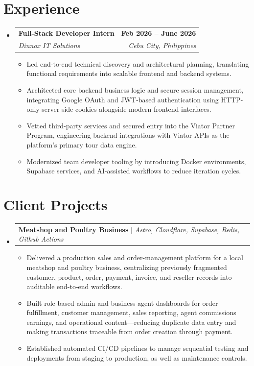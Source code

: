 \documentclass[letterpaper,11pt]{article}
\makeatletter
\newcommand{\resumeItem}[1]{
  \item\small{
    {#1 \vspace{0pt}}
  }
}
\newcommand{\resumeSubheading}[4]{
  \vspace{-2pt}\item
    \begin{tabular*}{1.0\textwidth}[t]{l@{\extracolsep{\fill}}r}
      \textbf{#1} & \textbf{\small #2} \\
      \textit{\small#3} & \textit{\small #4} \\
    \end{tabular*}\vspace{-7pt}
}
\newcommand{\resumeProjectHeading}[2]{
    \item
    \begin{tabular*}{1.001\textwidth}{l@{\extracolsep{\fill}}r}
      \small#1 & \textbf{\small #2}\\
    \end{tabular*}\vspace{-7pt}
}
\newcommand{\resumeSubHeadingListStart}{\begin{itemize}[leftmargin=0.0in, label={}]}
\newcommand{\resumeSubHeadingListEnd}{\end{itemize}}\vspace{0pt}
\newcommand{\resumeItemListStart}{\begin{itemize}}
\newcommand{\resumeItemListEnd}{\end{itemize}\vspace{-5pt}}
\makeatother
\begin{document}
\section{Experience}
    \resumeSubHeadingListStart
      \resumeSubheading{Full-Stack Developer Intern}{Feb 2026 -- June 2026}{Dinnox IT Solutions}{Cebu City, Philippines} 
        \resumeItemListStart
          \resumeItem{Led end-to-end technical discovery and architectural planning, translating functional requirements into scalable frontend and backend systems.}
          \resumeItem{Architected core backend business logic and secure session management, integrating Google OAuth and JWT-based authentication using HTTP-only server-side cookies alongside modern frontend interfaces.}
          \resumeItem{Vetted third-party services and secured entry into the Viator Partner Program, engineering backend integrations with Viator APIs as the platform's primary tour data engine.}
          \resumeItem{Modernized team developer tooling by introducing Docker environments, Supabase services, and AI-assisted workflows to reduce iteration cycles.}
        \resumeItemListEnd
    \resumeSubHeadingListEnd
    \vspace{-12pt}

\section{Client Projects}
    \vspace{-5pt}
    \resumeSubHeadingListStart
      \resumeProjectHeading{\textbf{Meatshop and Poultry Business} $|$ \emph{Astro, Cloudflare, Supabase, Redis, Github Actions}}{}
        \resumeItemListStart
          \resumeItem{Delivered a production sales and order-management platform for a local meatshop and poultry business, centralizing previously fragmented customer, product, order, payment, invoice, and reseller records into auditable end-to-end workflows.}
          \resumeItem{Built role-based admin and business-agent dashboards for order fulfillment, customer management, sales reporting, agent commissions earnings, and operational content---reducing duplicate data entry and making transactions traceable from order creation through payment.}
          \resumeItem{Established automated CI/CD pipelines to manage sequential testing and deployments from staging to production, as well as maintenance controls.}
        \resumeItemListEnd
    \resumeSubHeadingListEnd
\vspace{-12pt}
\end{document}

